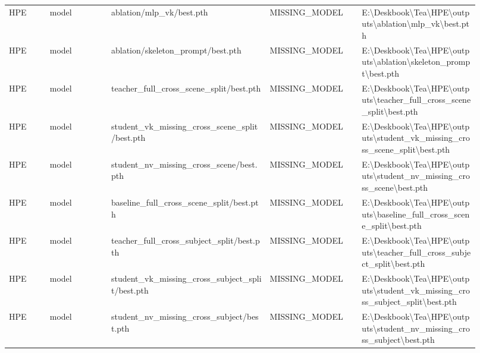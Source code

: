 \begin{longtable}{p{0.08\linewidth}p{0.12\linewidth}p{0.31\linewidth}p{0.18\linewidth}p{0.23\linewidth}}
HPE & model & ablation/mlp\_vk/best.pth & MISSING\_MODEL & \scriptsize E:\textbackslash{}Deskbook\textbackslash{}Tea\textbackslash{}HPE\textbackslash{}outputs\textbackslash{}ablation\textbackslash{}mlp\_vk\textbackslash{}best.pth\\
HPE & model & ablation/skeleton\_prompt/best.pth & MISSING\_MODEL & \scriptsize E:\textbackslash{}Deskbook\textbackslash{}Tea\textbackslash{}HPE\textbackslash{}outputs\textbackslash{}ablation\textbackslash{}skeleton\_prompt\textbackslash{}best.pth\\
HPE & model & teacher\_full\_cross\_scene\_split/best.pth & MISSING\_MODEL & \scriptsize E:\textbackslash{}Deskbook\textbackslash{}Tea\textbackslash{}HPE\textbackslash{}outputs\textbackslash{}teacher\_full\_cross\_scene\_split\textbackslash{}best.pth\\
HPE & model & student\_vk\_missing\_cross\_scene\_split/best.pth & MISSING\_MODEL & \scriptsize E:\textbackslash{}Deskbook\textbackslash{}Tea\textbackslash{}HPE\textbackslash{}outputs\textbackslash{}student\_vk\_missing\_cross\_scene\_split\textbackslash{}best.pth\\
HPE & model & student\_nv\_missing\_cross\_scene/best.pth & MISSING\_MODEL & \scriptsize E:\textbackslash{}Deskbook\textbackslash{}Tea\textbackslash{}HPE\textbackslash{}outputs\textbackslash{}student\_nv\_missing\_cross\_scene\textbackslash{}best.pth\\
HPE & model & baseline\_full\_cross\_scene\_split/best.pth & MISSING\_MODEL & \scriptsize E:\textbackslash{}Deskbook\textbackslash{}Tea\textbackslash{}HPE\textbackslash{}outputs\textbackslash{}baseline\_full\_cross\_scene\_split\textbackslash{}best.pth\\
HPE & model & teacher\_full\_cross\_subject\_split/best.pth & MISSING\_MODEL & \scriptsize E:\textbackslash{}Deskbook\textbackslash{}Tea\textbackslash{}HPE\textbackslash{}outputs\textbackslash{}teacher\_full\_cross\_subject\_split\textbackslash{}best.pth\\
HPE & model & student\_vk\_missing\_cross\_subject\_split/best.pth & MISSING\_MODEL & \scriptsize E:\textbackslash{}Deskbook\textbackslash{}Tea\textbackslash{}HPE\textbackslash{}outputs\textbackslash{}student\_vk\_missing\_cross\_subject\_split\textbackslash{}best.pth\\
HPE & model & student\_nv\_missing\_cross\_subject/best.pth & MISSING\_MODEL & \scriptsize E:\textbackslash{}Deskbook\textbackslash{}Tea\textbackslash{}HPE\textbackslash{}outputs\textbackslash{}student\_nv\_missing\_cross\_subject\textbackslash{}best.pth\\

\end{longtable}
